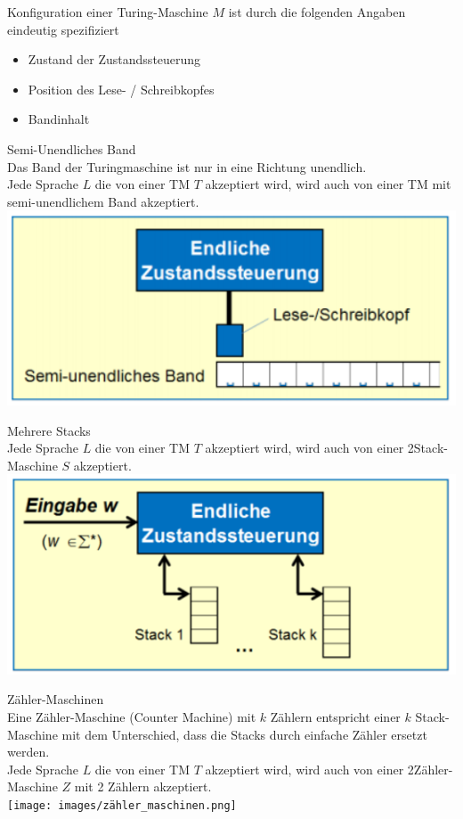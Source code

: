 \begin{definition}{Konfiguration}
    einer Turing-Maschine $M$ ist durch die folgenden Angaben eindeutig spezifiziert
    \begin{itemize}
    \item Zustand der Zustandssteuerung
    \item Position des Lese- / Schreibkopfes
    \item Bandinhalt
    \end{itemize}
\end{definition}

\begin{concept}{Semi-Unendliches Band}\\
    Das Band der Turingmaschine ist nur in eine Richtung unendlich.\\
    Jede Sprache $L$ die von einer TM $T$ akzeptiert wird, wird auch von einer TM mit semi-unendlichem Band akzeptiert.\\
    \includegraphics[width=0.3\linewidth]{images/semi_unendliches_band.png}
\end{concept}

\begin{concept}{Mehrere Stacks}\\
    Jede Sprache $L$ die von einer TM $T$ akzeptiert wird, wird auch von einer 2Stack-Maschine $S$ akzeptiert.\\
    \includegraphics[width=0.3\linewidth]{images/mehrere_stacks_tm.png}
\end{concept}

\begin{concept}{Zähler-Maschinen}\\
    Eine Zähler-Maschine (Counter Machine) mit $k$ Zählern entspricht einer $k$ Stack-Maschine mit dem Unterschied, dass die Stacks durch einfache Zähler ersetzt werden.\\
    Jede Sprache $L$ die von einer TM $T$ akzeptiert wird, wird auch von einer 2Zähler-Maschine $Z$ mit 2 Zählern akzeptiert.\\
    \texttt{[image: images/zähler\_maschinen.png]}
\end{concept}

